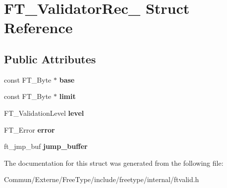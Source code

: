 \hypertarget{struct_f_t___validator_rec__}{}\section{F\+T\+\_\+\+Validator\+Rec\+\_\+ Struct Reference}
\label{struct_f_t___validator_rec__}
\subsection*{Public Attributes}
\begin{DoxyCompactItemize}
\item 
const F\+T\+\_\+\+Byte $\ast$ {\bfseries base}\hypertarget{struct_f_t___validator_rec___a62de459b75acae3e1695b3d6600ca22f}{}\label{struct_f_t___validator_rec___a62de459b75acae3e1695b3d6600ca22f}

\item 
const F\+T\+\_\+\+Byte $\ast$ {\bfseries limit}\hypertarget{struct_f_t___validator_rec___acc4d58a3e46d2b7c92bb51c3ddd8d331}{}\label{struct_f_t___validator_rec___acc4d58a3e46d2b7c92bb51c3ddd8d331}

\item 
F\+T\+\_\+\+Validation\+Level {\bfseries level}\hypertarget{struct_f_t___validator_rec___aa70830280c76507b8b06e616da8cb545}{}\label{struct_f_t___validator_rec___aa70830280c76507b8b06e616da8cb545}

\item 
F\+T\+\_\+\+Error {\bfseries error}\hypertarget{struct_f_t___validator_rec___ab12d54f54a55a90ce19761a1c24e28f0}{}\label{struct_f_t___validator_rec___ab12d54f54a55a90ce19761a1c24e28f0}

\item 
ft\+\_\+jmp\+\_\+buf {\bfseries jump\+\_\+buffer}\hypertarget{struct_f_t___validator_rec___aa0b346f9ef78939e93c85389aa2b54b3}{}\label{struct_f_t___validator_rec___aa0b346f9ef78939e93c85389aa2b54b3}

\end{DoxyCompactItemize}


The documentation for this struct was generated from the following file\+:\begin{DoxyCompactItemize}
\item 
Commun/\+Externe/\+Free\+Type/include/freetype/internal/ftvalid.\+h\end{DoxyCompactItemize}
